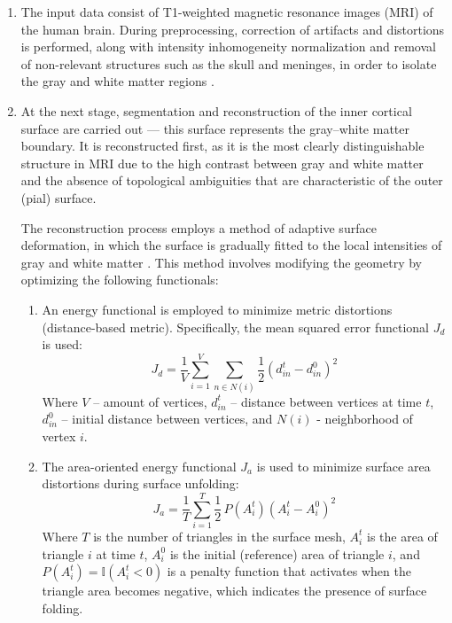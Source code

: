 \documentclass[default]{subfiles}
\begin{document}
\begin{enumerate}
    \item The input data consist of T1-weighted magnetic resonance images (MRI) of the human brain. During
    preprocessing, correction of artifacts and distortions is performed, along with intensity inhomogeneity
    normalization and removal of non-relevant structures such as the skull and meninges, in order to isolate the gray
    and white matter regions \cite{desikan_2006, fischl_2012}.

    \item At the next stage, segmentation and reconstruction of the inner cortical surface are carried out — this
    surface represents the gray–white matter boundary. It is reconstructed first, as it is the most clearly
    distinguishable structure in MRI due to the high contrast between gray and white matter and the absence of
    topological ambiguities that are characteristic of the outer (pial) surface.

    The reconstruction process employs a method of adaptive surface deformation, in which the surface is gradually
    fitted to the local intensities of gray and white matter \cite{fischl_1999}. This method involves modifying the
    geometry by optimizing the following functionals:

    \begin{enumerate}
        \item An energy functional is employed to minimize metric distortions (distance-based metric). Specifically,
        the mean squared error functional $J_d$ is used:
        $$J_d = \frac{1}{V}\sum_{i=1}^{V}\sum_{n \in N\left(i\right)}^{}\frac{1}{2}\left(d^t_{in} - d^0_{in}\right)^2$$
        Where $V$ – amount of vertices, $d^t_{in}$ – distance between vertices at time $t$, $d^0_{in}$ – initial
        distance between vertices, and $N\left(i\right)$ - neighborhood of vertex $i$.

        \item The area-oriented energy functional $J_a$ is used to minimize surface area distortions during surface
        unfolding:
        $$J_a = \frac{1}{T} \sum_{i=1}^{T} \frac{1}{2} \, P(A_i^t) \left( A_i^t - A_i^0 \right)^2$$
        Where $T$ is the number of triangles in the surface mesh, $A_i^t$ is the area of triangle $i$ at time
        $t$, $A_i^0$ is the initial (reference) area of triangle $i$, and $P(A_i^t) = \mathbb{I}(A_i^t < 0)$ is a
        penalty function that activates when the triangle area becomes negative, which indicates the presence of
        surface folding.


\end{enumerate}
\end{enumerate}
\end{document}
